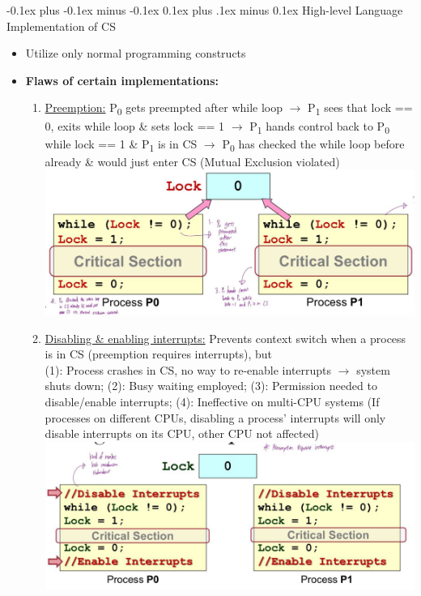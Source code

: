 \documentclass[landscape]{article}
\makeatletter
\renewcommand{\subsection}{\@startsection{subsection}{2}{0mm}%
  {-0.1ex plus -0.1ex minus -0.1ex}%
  {0.1ex plus .1ex minus 0.1ex}%
{\normalfont\scriptsize\bfseries}}
\makeatother
\begin{document}
\begin{multicols*}{6}
    \subsection{High-level Language Implementation of CS}
    \begin{itemize}
      \item Utilize only normal programming constructs
      \item \textbf{Flaws of certain implementations:}
      \begin{enumerate}
        \item \underline{Preemption:} P\textsubscript{0} gets preempted after while loop $\rightarrow$ P\textsubscript{1} sees that lock == 0, exits while loop \& sets lock == 1 $\rightarrow$ P\textsubscript{1} hands control back to P\textsubscript{0} while lock == 1 \& P\textsubscript{1} is in CS $\rightarrow$ P\textsubscript{0} has checked the while loop before already \& would just enter CS (Mutual Exclusion violated)
        \includegraphics[width=0.9\linewidth]{2_attempt1.jpg}
        \item \underline{Disabling \& enabling interrupts:} Prevents context switch when a process is in CS (preemption requires interrupts), but \\ (1): Process crashes in CS, no way to re-enable interrupts $\rightarrow$ system shuts down; (2): Busy waiting employed; (3): Permission needed to disable/enable interrupts; (4): Ineffective on multi-CPU systems (If processes on different CPUs, disabling a process' interrupts will only disable interrupts on its CPU, other CPU not affected)
        \includegraphics[width=0.9\linewidth]{3_attempt2.jpg}

\end{enumerate}
\end{itemize}
\end{multicols*}
\end{document}
